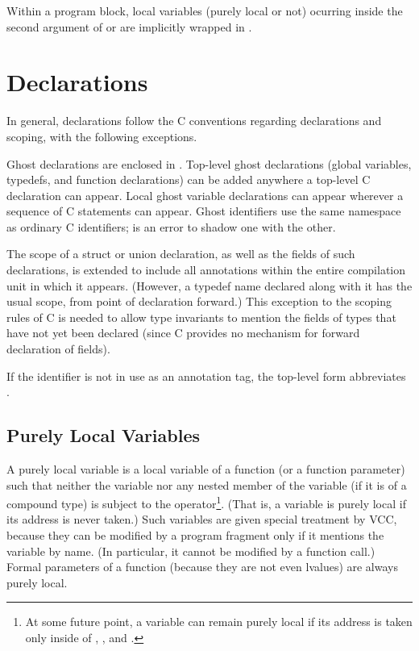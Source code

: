 \documentclass[preprint,nocopyrightspace]{sigplanconf}
\begin{document}
{{{{\begin{VCC}
Within a program block, local variables (purely local or not) ocurring
inside the second argument of \vcc{\claims} or  are
implicitly wrapped in .

\section{Declarations}
In general, declarations follow the C conventions regarding
declarations and scoping, with the following exceptions. 

Ghost declarations are enclosed in .  Top-level ghost
declarations (global variables, typedefs, and function declarations)
can be added anywhere a top-level C declaration can appear. Local
ghost variable declarations can appear wherever a sequence of C
statements can appear.  Ghost identifiers use the same namespace as
ordinary C identifiers; is an error to shadow one with the other.

The scope of a struct or union declaration, as well as the fields of
such declarations, is extended to include all annotations within the
entire compilation unit in which it appears. (However, a typedef name
declared along with it has the usual scope, from point of declaration
forward.) This exception to the scoping rules of C is needed to allow
type invariants to mention the fields of types that have not yet been
declared (since C provides no mechanism for forward declaration of
fields).

If the identifier  is not in use as an annotation tag, the
top-level form  abbreviates .

\subsection{Purely Local Variables}
A purely local variable is a local variable of a function (or a
function parameter) such that neither the variable nor any nested
member of the variable (if it is of a compound type) is subject to
the \vcc{&} operator\footnote{
At some future point, a variable can remain purely local if its
address is taken only inside of , , and .
}. (That is, a variable is purely local if its
address is never taken.) Such variables are given special treatment
by VCC, because they can be modified by a program fragment only if it
mentions the variable by name. (In particular, it cannot be modified
by a function call.) Formal parameters of a function (because they are not even
lvalues) are always purely local. 


\end{VCC}}}}}
\end{document}
